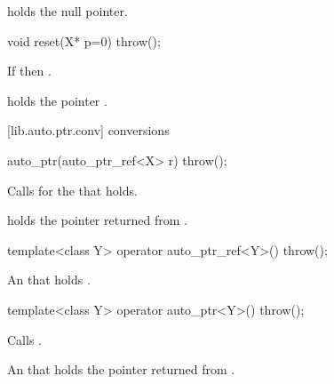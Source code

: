 \begin{itemdescr}
\pnum
\returns
{}

\pnum
\postcondition
{} holds the null pointer.
\end{itemdescr}

%
\begin{itemdecl}
void reset(X* p=0) throw();
\end{itemdecl}

\begin{itemdescr}
\pnum
\effects
If  then .

\pnum
\postconditions
{} holds the pointer .
\end{itemdescr}

[lib.auto.ptr.conv]{ conversions}

%
\begin{itemdecl}
auto_ptr(auto_ptr_ref<X> r) throw();
\end{itemdecl}

\begin{itemdescr}
\pnum
\effects
Calls  for the   that  holds.

\pnum
\postconditions
{} holds the pointer returned from .
\end{itemdescr}

%
%
\begin{itemdecl}
template<class Y> operator auto_ptr_ref<Y>() throw();
\end{itemdecl}

\begin{itemdescr}
\pnum
\returns
An  that holds .
\end{itemdescr}

%
%
\begin{itemdecl}
template<class Y> operator auto_ptr<Y>() throw();
\end{itemdecl}

\begin{itemdescr}
\pnum
\effects
Calls .

\pnum
\returns
An  that holds the pointer returned from .
\end{itemdescr}

